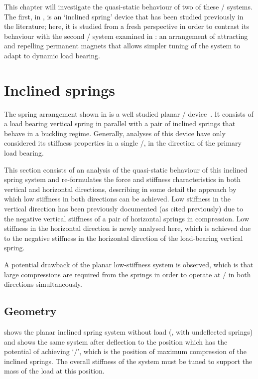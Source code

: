 \documentclass[11pt,a4paper]{memoir}
\begin{document}
This chapter will investigate the quasi-static behaviour of two of these \qzs/ systems.
The first, in , is an `inclined spring' device that has been studied previously in the literature; here, it is studied from a fresh perspective in order to contrast its behaviour with the second \qzs/ system examined in : an arrangement of attracting and repelling permanent magnets that allows simpler tuning of the system to adapt to dynamic load bearing.


\section{Inclined springs}

The spring arrangement shown in  is a well studied planar \qzs/ device~\cite{molyneux1957,alabuzhev1989,carrella2007-jsv,carrella2009-jsv}.
It consists of a load bearing vertical spring in parallel with a pair of inclined springs that behave in a buckling regime.
Generally, analyses of this device have only considered its stiffness properties in a single \dof/, in the direction of the primary load bearing.

This section consists of an analysis of the quasi-static behaviour of this inclined spring system and re-formulates the force and stiffness characteristics in both vertical and horizontal directions, describing in some detail the approach by which low stiffness in both directions can be achieved.
Low stiffness in the vertical direction has been previously documented (as cited previously) due to the negative vertical stiffness of a pair of horizontal springs in compression.
Low stiffness in the horizontal direction is newly analysed here, which is achieved due to the negative stiffness in the horizontal direction of the load-bearing vertical spring.

A potential drawback of the planar low-stiffness system is observed, which is that large compressions are required from the springs in order to operate at \qzs/ in both directions simultaneously.

\subsection{Geometry}

 shows the planar inclined spring system without load (\ie,
with undeflected springs) and  shows the same system after
deflection to the position which has the potential of achieving `\qzs/', which
is the position of maximum compression of the inclined springs. The overall
stiffness of the system must be tuned to support the mass of the load at this
position.
\end{document}
